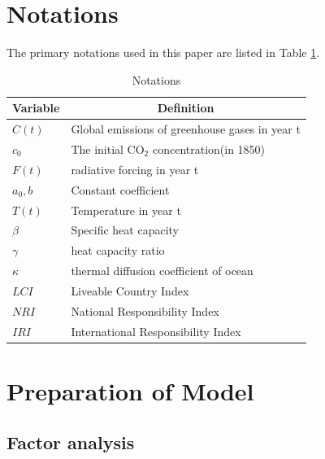\documentclass[12pt]{article}  %
\begin{document}
\section{Notations}
The primary notations used in this paper are listed in Table \ref{Notations}.
\begin{table}[htbp]
  \centering
  \caption{Notations}
    \begin{tabular}{ll}
    \toprule
    \multicolumn{1}{c}{Variable} & \multicolumn{1}{c}{Definition} \\
    \midrule
    $C(t)$  & Global emissions of greenhouse gases in year t \\
    
    $c_0$    & The initial CO$_2$ concentration(in 1850) \\
    $F(t)$  & radiative forcing in year t \\
    $a_0,b$  & \textcolor[rgb]{ .133,  .133,  .133}{Constant coefficient} \\
    $T(t)$  & \textcolor[rgb]{ .2,  .2,  .2}{Temperature in year t} \\
    $\beta$  & Specific heat capacity \\
    $\gamma$ & heat capacity ratio  \\
    $\kappa$ & \multicolumn{1}{p{25.555em}}{thermal diffusion coefficient of ocean} \\
    $LCI$   & Liveable Country Index \\
    $NRI$   & \textcolor[rgb]{ .133,  .133,  .133}{National Responsibility Index} \\
    $IRI$   & International Responsibility Index \\
    \toprule
    \end{tabular}%
  \label{Notations}%
\end{table}%



\section{Preparation of Model}




\subsection{Factor analysis}
\end{document}
